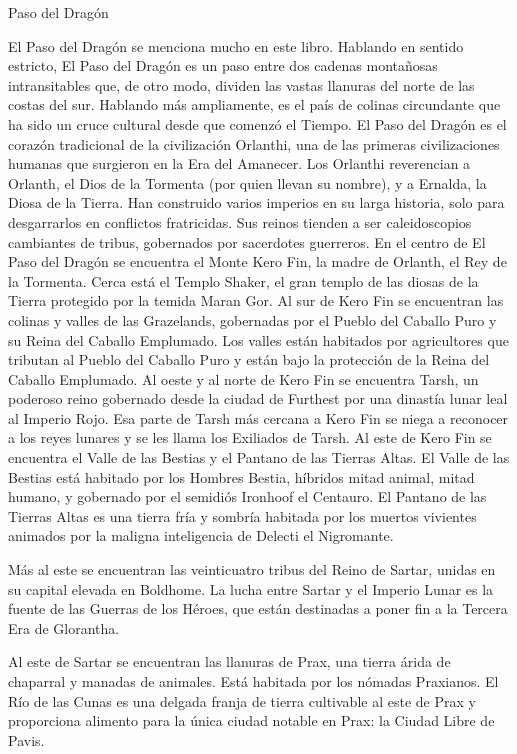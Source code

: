 \begin{GloranthaInfoBox}{Paso del Dragón}

El Paso del Dragón se menciona mucho en este libro. Hablando en sentido estricto, El Paso del Dragón es un paso entre dos cadenas montañosas intransitables que, de otro modo, dividen las vastas llanuras del norte de las costas del sur. Hablando más ampliamente, es el país de colinas circundante que ha sido un cruce cultural desde que comenzó el Tiempo.
El Paso del Dragón es el corazón tradicional de la civilización Orlanthi, una de las primeras civilizaciones humanas que surgieron en la Era del Amanecer. Los Orlanthi reverencian a Orlanth, el Dios de la Tormenta (por quien llevan su nombre), y a Ernalda, la Diosa de la Tierra. Han construido varios imperios en su larga historia, solo para desgarrarlos en conflictos fratricidas. Sus reinos tienden a ser caleidoscopios cambiantes de tribus, gobernados por sacerdotes guerreros.
En el centro de El Paso del Dragón se encuentra el Monte Kero Fin, la madre de Orlanth, el Rey de la Tormenta. Cerca está el Templo Shaker, el gran templo de las diosas de la Tierra protegido por la temida Maran Gor.
Al sur de Kero Fin se encuentran las colinas y valles de las Grazelands, gobernadas por el Pueblo del Caballo Puro y su Reina del Caballo Emplumado. Los valles están habitados por agricultores que tributan al Pueblo del Caballo Puro y están bajo la protección de la Reina del Caballo Emplumado.
Al oeste y al norte de Kero Fin se encuentra Tarsh, un poderoso reino gobernado desde la ciudad de Furthest por una dinastía lunar leal al Imperio Rojo. Esa parte de Tarsh más cercana a Kero Fin se niega a reconocer a los reyes lunares y se les llama los Exiliados de Tarsh.
Al este de Kero Fin se encuentra el Valle de las Bestias y el Pantano de las Tierras Altas. El Valle de las Bestias está habitado por los Hombres Bestia, híbridos mitad animal, mitad humano, y gobernado por el semidiós Ironhoof el Centauro. El Pantano de las Tierras Altas es una tierra fría y sombría habitada por los muertos vivientes animados por la maligna inteligencia de Delecti el Nigromante.
	
    Más al este se encuentran las veinticuatro tribus del Reino de Sartar, unidas en su capital elevada en Boldhome. La lucha entre Sartar y el Imperio Lunar es la fuente de las Guerras de los Héroes, que están destinadas a poner fin a la Tercera Era de Glorantha.
	
    Al este de Sartar se encuentran las llanuras de Prax, una tierra árida de chaparral y manadas de animales. Está habitada por los nómadas Praxianos. El Río de las Cunas es una delgada franja de tierra cultivable al este de Prax y proporciona alimento para la única ciudad notable en Prax: la Ciudad Libre de Pavis.
	

\end{GloranthaInfoBox}
